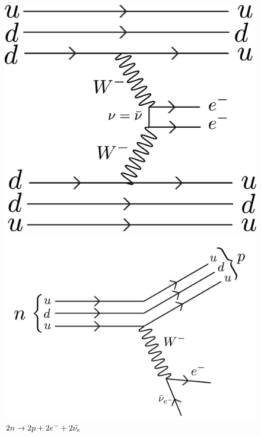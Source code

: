 \begin{figure}[hbtp]
\begin{minipage}{0.4\textwidth}
        \includegraphics[scale=0.2]{Feynman/neutrinoless.jpg}
        \caption{$2n \to 2p + 2e^-$}
    \end{minipage}
    \vspace{30pt}
    \includegraphics[scale=0.05]{Feynman/worldwouldbeboring-01.jpg}
    \caption{$2n \to 2p + 2e^- + 2\Bar{\nu_e}$}
    \label{fig:feynman_diagrams}
\end{figure}

